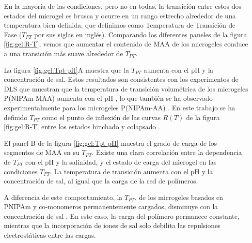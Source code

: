 En la mayor\'ia de las condiciones, pero no en todas, la transici\'on entre estos dos estados del microgel es brusca y ocurre en un rango estrecho alrededor de una temperatura bien definida, que definimos como Temperatura de Transici\'on de Fase  ($T_{PT}$ por sus siglas en ingl\'es). Comparando los diferentes paneles de la figura \ref{fig:gel:R-T}, vemos que aumentar el contenido de MAA de los microgeles conduce a una transici\'on m\'as suave alrededor de $T_{PT}$.

La figura \ref{fig:gel:Tpt-pH}A muestra que la $T_{PT}$ aumenta con el pH y la concentraci\'on de sal. Estos resultados son consistentes con los experimentos de DLS que muestran que la temperatura de transici\'on volum\'etrica de los microgeles P(NIPAm-MAA) aumenta con el pH \cite{Kleinen2008}, lo que tambi\'en se ha observado experimentalmente para los microgeles P(NIPAm-AA) \cite{CaprilesGonzalez2008}. En este trabajo se ha definido $T_{PT}$ como el punto de inflexi\'on de las curvas $R(T)$ de la figura \ref{fig:gel:R-T} entre los estados hinchado y colapsado \cite{Kratz2001}.

El panel B de la figura \ref{fig:gel:Tpt-pH} muestra el grado de carga de los segmentos de MAA en su $T_{PT}$. Existe una clara correlaci\'on entre la dependencia de $T_{PT}$ con el pH y la salinidad, y el estado de carga del microgel en las condiciones $T_{PT}$. La temperatura de transici\'on aumenta con el pH y la concentraci\'on de sal, al igual que la carga de la red de pol\'imeros.

A diferencia de este comportamiento, la $T_{PT}$, de los microgeles basados en PNIPAm y co-monomeros permanentemente cargados,  disminuye con la concentraci\'on de sal \cite{Lopez2020}. En este caso, la carga del pol\'imero permanece constante, mientras que la incorporaci\'on de iones de sal solo debilita las repulsiones electrost\'aticas entre las cargas.


